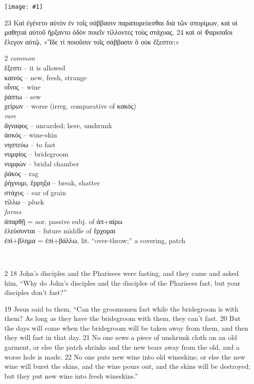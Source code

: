 \documentclass[10pt,a5paper,twoside,twocolumn]{book}
\newcommand{\fig}[1]{\texttt{[image: \#1]}\label{fig:#1}}
\newcommand*\cleartoleftpage{%
  \ifodd\value{page}\hbox{}\clearpage\fi
}
\newcommand{\separator}{\hspace{0.27\textwidth}\noindent\makebox[\linewidth]{\resizebox{0.3333\linewidth}{1pt}{$\bullet$}}\bigskip}
\newenvironment{facing}{\cleartoleftpage}{\clearpage\pagebreak}
\newenvironment{help}{\clearpage}{}
\newenvironment{helpsec}{\begin{minipage}[t]{\textwidth}\begin{multicols}{2}}{\end{multicols}\end{minipage}}
\newenvironment{vocab}{\begin{helpsec}}{\end{helpsec}}
\newenvironment{translation}{\separator\\\begin{helpsec}\footnotesize}{\end{helpsec}}
\begin{document}
\vfill

\fig{02-23} %

	23 Καὶ ἐγένετο αὐτὸν ἐν τοῖς σάββασιν παραπορεύεσθαι διὰ τῶν σπορίμων, καὶ οἱ μαθηταὶ αὐτοῦ ἤρξαντο ὁδὸν ποιεῖν τίλλοντες τοὺς στάχυας.
 24 καὶ οἱ Φαρισαῖοι ἔλεγον αὐτῷ, «Ἴδε τί ποιοῦσιν τοῖς σάββασιν ὃ οὐκ ἔξεστιν;»



\begin{facing}
\begin{help}
\begin{vocab}
\emph{common}\\
ἔξεστι -- it is allowed\\
καινός -- new, fresh, strange\\
οἶνος -- wine\\
ῥάπτω -- sew\\
χείρων -- worse (irreg. comparative of κακός)\\

\emph{rare}\\
ἄγναφος -- uncarded; here, unshrunk\\
ἀσκός -- wine-skin\\
νηστεύω -- to fast\\
νυμφίος -- bridegroom\\
νυμφών -- bridal chamber\\
ῥάκος -- rag\\
ῥήγνυμι, ἔρρηξα -- break, shatter \\
στάχυς -- ear of grain\\
τίλλω -- pluck\\

\emph{forms}\\
ἀπαρθῇ = aor. passive subj. of ἀπ+αίρω\\
ἐλεύσονται -- future middle of ἔρχομαι\\
ἐπί+βλημα = ἐπί+βάλλω, lit. ``over-throw;'' a covering, patch\\

\end{vocab}
\begin{translation}
 18 John's disciples and the Pharisees were fasting, and they came and asked him, ``Why do John's disciples and the disciples of the Pharisees fast, but your disciples don't fast?''

19 Jesus said to them, ``Can the groomsmen fast while the bridegroom is with them? As long as they have the bridegroom with them, they can't fast. 20  But the days will come when the bridegroom will be taken away from them, and then they will fast in that day. 21  No one sews a piece of unshrunk cloth on an old garment, or else the patch shrinks and the new tears away from the old, and a worse hole is made. 22  No one puts new wine into old wineskins; or else the new wine will burst the skins, and the wine pours out, and the skins will be destroyed; but they put new wine into fresh wineskins.''


\end{translation}
\end{help}
\end{facing}
\end{document}
